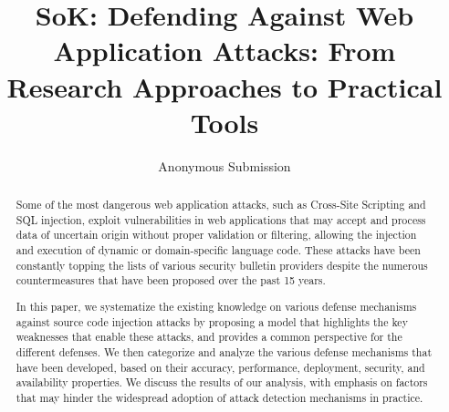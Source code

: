 \documentclass[conference]{IEEEtran}
\date{}
\begin{document}

\author{Anonymous Submission}

\title{SoK: Defending Against Web Application Attacks: From Research
  Approaches to Practical Tools}

\maketitle
\begin{abstract}

  Some of the most dangerous web application attacks, such as Cross-Site
  Scripting and SQL injection, exploit vulnerabilities
  in web applications that may accept and process
  data of uncertain origin without proper validation or
  filtering, allowing the injection and execution of
  dynamic or domain-specific language code.
  These attacks have been constantly topping the lists of
  various security bulletin providers despite the numerous
  countermeasures that have been proposed over the past 15 years.

  In this paper, we systematize the existing knowledge on
  various defense mechanisms against source code injection attacks by proposing
  a model that highlights the key weaknesses that enable these attacks,
  and provides a common perspective for the different defenses.
  We then categorize and analyze the various defense mechanisms that
  have been developed, based on their accuracy, performance,
  deployment, security, and availability properties.
  We discuss the results of our analysis, with emphasis on factors
  that may hinder the widespread adoption of attack detection
  mechanisms in practice.

\end{abstract}
\end{document}
